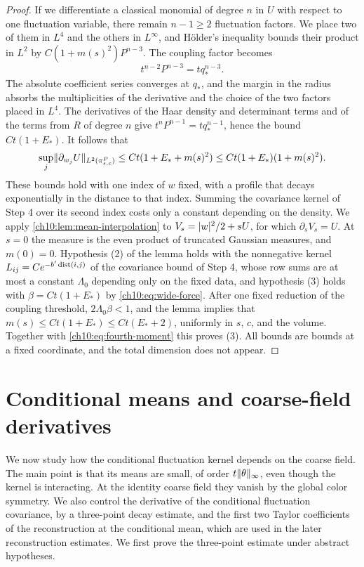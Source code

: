 \begin{proof}
If we differentiate a classical monomial of degree $n$ in $U$ with respect to one fluctuation variable, there remain $n-1\ge2$ fluctuation factors. We place two of them in $L^4$ and the others in $L^\infty$, and Hölder's inequality bounds their product in $L^2$ by $C(1+m(s)^2)P^{n-3}$. The coupling factor becomes
\begin{equation}\label{ch10:eq:two-l4-power}
 t^{n-2}P^{n-3}=tq_*^{n-3}.
\end{equation}
The absolute coefficient series converges at $q_*$, and the margin in the radius absorbs the multiplicities of the derivative and the choice of the two factors placed in $L^4$. The derivatives of the Haar density and determinant terms and of the terms from $R$ of degree $n$ give $t^nP^{n-1}=tq_*^{n-1}$, hence the bound $Ct(1+E_*)$. It follows that
\begin{equation}\label{ch10:eq:wide-force}
 \sup_j\lVert \partial_{w_j}U\rVert_{L^2(\pi^P_{s,c})}\le Ct(1+E_*+m(s)^2)\le Ct(1+E_*)(1+m(s)^2).
\end{equation}
These bounds hold with one index of $w$ fixed, with a profile that decays exponentially in the distance to that index. Summing the covariance kernel of Step 4 over its second index costs only a constant depending on the density. We apply \cref{ch10:lem:mean-interpolation} to $V_s=\lvert w\rvert^2/2+sU$, for which $\partial_sV_s=U$. At $s=0$ the measure is the even product of truncated Gaussian measures, and $m(0)=0$. Hypothesis (2) of the lemma holds with the nonnegative kernel $L_{ij}=Ce^{-b'\operatorname{dist}(i,j)}$ of the covariance bound of Step 4, whose row sums are at most a constant $\Lambda_0$ depending only on the fixed data, and hypothesis (3) holds with $\beta=Ct(1+E_*)$ by \eqref{ch10:eq:wide-force}. After one fixed reduction of the coupling threshold, $2\Lambda_0\beta<1$, and the lemma implies that $m(s)\le Ct(1+E_*)\le Ct(E_*+2)$, uniformly in $s$, $c$, and the volume. Together with \eqref{ch10:eq:fourth-moment} this proves (3). All bounds are bounds at a fixed coordinate, and the total dimension does not appear.
\end{proof}

\section{Conditional means and coarse-field derivatives}\label{ch10:sec:means}

We now study how the conditional fluctuation kernel depends on the coarse field. The main point is that its means are small, of order $t\lVert \theta\rVert_\infty$, even though the kernel is interacting. At the identity coarse field they vanish by the global color symmetry. We also control the derivative of the conditional fluctuation covariance, by a three-point decay estimate, and the first two Taylor coefficients of the reconstruction at the conditional mean, which are used in the later reconstruction estimates. We first prove the three-point estimate under abstract hypotheses.

